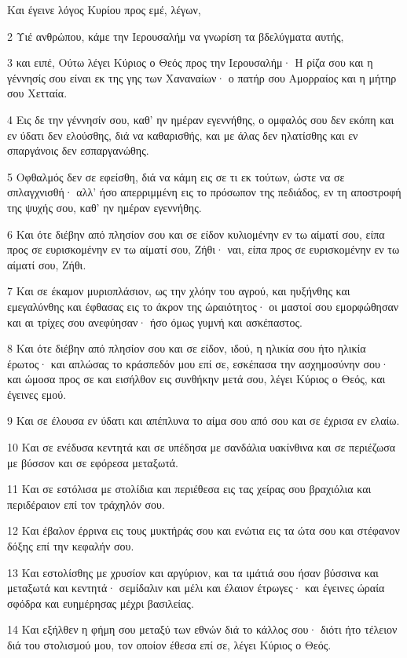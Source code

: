 \par Και έγεινε λόγος Κυρίου προς εμέ, λέγων,
\par 2 Υιέ ανθρώπου, κάμε την Ιερουσαλήμ να γνωρίση τα βδελύγματα αυτής,
\par 3 και ειπέ, Ούτω λέγει Κύριος ο Θεός προς την Ιερουσαλήμ· Η ρίζα σου και η γέννησίς σου είναι εκ της γης των Χαναναίων· ο πατήρ σου Αμορραίος και η μήτηρ σου Χετταία.
\par 4 Εις δε την γέννησίν σου, καθ' ην ημέραν εγεννήθης, ο ομφαλός σου δεν εκόπη και εν ύδατι δεν ελούσθης, διά να καθαρισθής, και με άλας δεν ηλατίσθης και εν σπαργάνοις δεν εσπαργανώθης.
\par 5 Οφθαλμός δεν σε εφείσθη, διά να κάμη εις σε τι εκ τούτων, ώστε να σε σπλαγχνισθή· αλλ' ήσο απερριμμένη εις το πρόσωπον της πεδιάδος, εν τη αποστροφή της ψυχής σου, καθ' ην ημέραν εγεννήθης.
\par 6 Και ότε διέβην από πλησίον σου και σε είδον κυλιομένην εν τω αίματί σου, είπα προς σε ευρισκομένην εν τω αίματί σου, Ζήθι· ναι, είπα προς σε ευρισκομένην εν τω αίματί σου, Ζήθι.
\par 7 Και σε έκαμον μυριοπλάσιον, ως την χλόην του αγρού, και ηυξήνθης και εμεγαλύνθης και έφθασας εις το άκρον της ώραιότητος· οι μαστοί σου εμορφώθησαν και αι τρίχες σου ανεφύησαν· ήσο όμως γυμνή και ασκέπαστος.
\par 8 Και ότε διέβην από πλησίον σου και σε είδον, ιδού, η ηλικία σου ήτο ηλικία έρωτος· και απλώσας το κράσπεδόν μου επί σε, εσκέπασα την ασχημοσύνην σου· και ώμοσα προς σε και εισήλθον εις συνθήκην μετά σου, λέγει Κύριος ο Θεός, και έγεινες εμού.
\par 9 Και σε έλουσα εν ύδατι και απέπλυνα το αίμα σου από σου και σε έχρισα εν ελαίω.
\par 10 Και σε ενέδυσα κεντητά και σε υπέδησα με σανδάλια υακίνθινα και σε περιέζωσα με βύσσον και σε εφόρεσα μεταξωτά.
\par 11 Και σε εστόλισα με στολίδια και περιέθεσα εις τας χείρας σου βραχιόλια και περιδέραιον επί τον τράχηλόν σου.
\par 12 Και έβαλον έρρινα εις τους μυκτήράς σου και ενώτια εις τα ώτα σου και στέφανον δόξης επί την κεφαλήν σου.
\par 13 Και εστολίσθης με χρυσίον και αργύριον, και τα ιμάτιά σου ήσαν βύσσινα και μεταξωτά και κεντητά· σεμίδαλιν και μέλι και έλαιον έτρωγες· και έγεινες ώραία σφόδρα και ευημέρησας μέχρι βασιλείας.
\par 14 Και εξήλθεν η φήμη σου μεταξύ των εθνών διά το κάλλος σου· διότι ήτο τέλειον διά του στολισμού μου, τον οποίον έθεσα επί σε, λέγει Κύριος ο Θεός.
